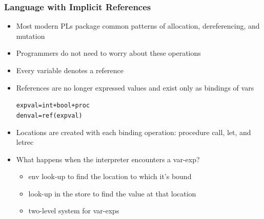 \documentclass{beamer}
\begin{document}
\begin{frame}[fragile]
\frametitle{Language with Implicit References}
\begin{scriptsize}
\begin{itemize}
\item<1-> Most modern PLs package common patterns of allocation, dereferencing, and mutation

\item<1-> Programmers do not need to worry about these operations

\item<2-> Every variable denotes a reference
\item<2-> References are no longer expressed values and exist only as bindings of vars
\begin{alltt}
		expval = int + bool + proc
		denval = ref(expval)
\end{alltt}

\item<3-> Locations are created with each binding operation: procedure call, let, and letrec

\item<4-> What happens when the interpreter encounters a var-exp?
\begin{itemize}
\item env look-up to find the location to which it’s bound
\item look-up in the store to find the value at that location
\item two-level system for var-exps
\end{itemize}

\end{itemize}
\end{scriptsize}
\end{frame}
\end{document}
